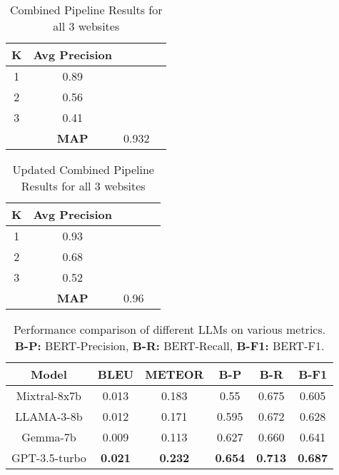 \documentclass[sigconf,natbib=true,anonymous=false]{acmart}
\begin{document}
\begin{table}[h]
\centering
\begin{tabular}{cccc}
\hline
\textbf{K} & \textbf{Avg Precision}\\ \hline
1          & 0.89                         \\
2          & 0.56                      \\
3          & 0.41                      \\ 
\hline
&\textbf{MAP}        &0.932& \\
\hline
\end{tabular}
\caption{Combined Pipeline Results for all 3 websites}
\label{tab:metrics_combined}
\end{table}

\begin{table}[h]
\centering
\begin{tabular}{cccc}
\hline
\textbf{K} & \textbf{Avg Precision} \\ \hline
1          & 0.93                   \\
2          & 0.68                           \\
3          & 0.52                    \\ 
\hline
&\textbf{MAP}        &0.96& \\
\hline
\end{tabular}
\caption{Updated Combined Pipeline Results for all 3 websites}
\label{tab:metrics_combined}
\end{table}






\begin{table}[ht]
    \centering
    \small
    \begin{tabular}{|c|c|c|c|c|c|}
        \hline
        \textbf{Model} & \textbf{BLEU} & \textbf{METEOR} & \textbf{B-P} & \textbf{B-R} & \textbf{B-F1} \\
        \hline
        Mixtral-8x7b & 0.013 & 0.183 & 0.55 & 0.675 & 0.605 \\
        \hline
        LLAMA-3-8b & 0.012 & 0.171 & 0.595 & 0.672 & 0.628 \\
        \hline
        Gemma-7b & 0.009 & 0.113 & 0.627 & 0.660 & 0.641 \\
        \hline
        GPT-3.5-turbo & \textbf{0.021}& \textbf{0.232} & \textbf{0.654} & \textbf{0.713} & \textbf{0.687} \\
        \hline
    \end{tabular}
    \vspace{0.25cm}
    \caption{Performance comparison of different LLMs on various metrics. \textbf{B-P:} BERT-Precision, \textbf{B-R:} BERT-Recall, \textbf{B-F1:} BERT-F1.}
    \label{tab:performance_comparison}
\end{table}
\end{document}
